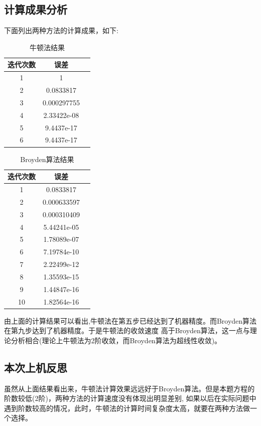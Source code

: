 \documentclass{ctexart}
\begin{document}
\subsection{计算成果分析}
下面列出两种方法的计算成果，如下:
\begin{center}
    \begin{longtable}{|c|c|c|}
        \caption{牛顿法结果} \\
        \hline
        迭代次数& 误差 \\
        \hline
        1& 1 \\
        \hline
        2& 0.0833817 \\
        \hline
        3& 0.000297755 \\
        \hline
        4& 2.33422e-08 \\
        \hline
        5& 9.4437e-17 \\
        \hline
        6& 9.4437e-17 \\
        \hline
    \end{longtable}
\end{center}
\begin{center}
    \begin{longtable}{|c|c|c|}
        \caption{Broyden算法结果} \\
        \hline
        迭代次数& 误差 \\
        \hline
        1& 0.0833817\\
        \hline
        2& 0.000633597 \\
        \hline
        3& 0.000310409 \\
        \hline
        4& 5.44241e-05 \\
        \hline
        5& 1.78089e-07 \\
        \hline
        6& 7.19784e-10 \\
        \hline
        7& 2.22499e-12 \\
        \hline
        8& 1.35593e-15 \\
        \hline
        9& 1.44847e-16 \\
        \hline
        10& 1.82564e-16 \\
        \hline
    \end{longtable}
\end{center}

由上面的计算结果可以看出,牛顿法在第五步已经达到了机器精度。而Broyden算法在第九步达到了机器精度。于是牛顿法的收敛速度
高于Broyden算法，这一点与理论分析相合(理论上牛顿法为2阶收敛，而Broyden算法为超线性收敛)。
\subsection{本次上机反思}
虽然从上面结果看出来，牛顿法计算效果远远好于Broyden算法。但是本题方程的阶数较低(2阶)，两种方法的计算速度没有体现出明显差别,
如果以后在实际问题中遇到阶数较高的情况，此时，牛顿法的计算时间复杂度太高，就要在两种方法做一个选择。
\end{document}
